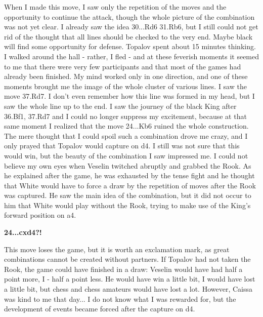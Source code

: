 \documentclass[
	11pt,twocolumn]{article}
\renewcommand{\bf}{\bfseries}
\begin{document}
When I made this move, I saw only the repetition of the moves and the opportunity to continue the attack, though the whole picture of the combination was not yet clear. I already saw the idea 30...Rd6 31.Rb6, but I still could not get rid of the thought that all lines should be checked to the very end. Maybe black will find some opportunity for defense. Topalov spent about 15 minutes thinking. I walked around the hall - rather, I fled - and at these feverish moments it seemed to me that there were very few participants and that most of the games had already been finished. My mind worked only in one direction, and one of these moments brought me the image of the whole cluster of various lines. I saw the move 37.Rd7. I don't even remember how this line was formed in my head, but I saw the whole line up to the end. I saw the journey of the black King after 36.Bf1, 37.Rd7 and I could no longer suppress my excitement, because at that same moment I realized that the move 24...Kb6 ruined the whole construction. The mere thought that I could spoil such a combination drove me crazy, and I only prayed that Topalov would capture on d4. I still was not sure that this would win, but the beauty of the combination I saw impressed me. I could not believe my own eyes when Veselin twitched abruptly and grabbed the Rook. As he explained after the game, he was exhausted by the tense fight and he thought that White would have to force a draw by the repetition of moves after the Rook was captured. He saw the main idea of the combination, but it did not occur to him that White would play without the Rook, trying to make use of the King's forward position on a4.

{\bf 24...cxd4?! }

This move loses the game, but it is worth an exclamation mark, as great combinations cannot be created without partners. If Topalov had not taken the Rook, the game could have finished in a draw: Veselin would have had half a point more, I - half a point less. He would have win a little bit, I would have lost a little bit, but chess and chess amateurs would have lost a lot. However, Caissa was kind to me that day... I do not know what I was rewarded for, but the development of events became forced after the capture on d4.
\end{document}

